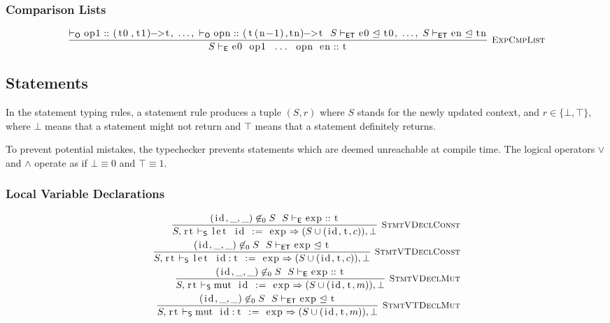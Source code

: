 \documentclass{article}
\newcommand{\code}[1]{\lstinline[columns=fixed]{#1}}
\newcommand{\drmrule}[5]{\frac{#1}{#2\vdash_{\mathsf{#3}}#4}\textsc{\ \small{#5}}}
\newcommand{\ruleapp}[1]{\vdash_{\mathsf{#1}}}
\newcommand{\mc}[1]{\textnormal{\code{#1}}}
\begin{document}
			\subsubsection{Comparison Lists}
			
				\begin{align*}
					\drmrule{\ruleapp{O}\mc{op1}::\mc{(t0,t1)->t},\ \dots,\ \ruleapp{O}\mc{opn}::\mc{(t(n-1),tn)->t}\ \ S\ruleapp{ET}\mc{e0}\trianglelefteq\mc{t0},\ \dots,\ S\ruleapp{ET}\mc{en}\trianglelefteq\mc{tn}}{S}{E}{\mc{e0 op1 ... opn en} :: \mc{t}}{ExpCmpList}
				\end{align*}
				
		\subsection{Statements}
		
			In the statement typing rules, a statement rule produces a tuple $(S,r)$ where $S$ stands for the newly updated context, and $r\in\{\bot,\top\}$, where $\bot$ means that a statement might not return and $\top$ means that a statement definitely returns.
			
			To prevent potential mistakes, the typechecker prevents statements which are deemed unreachable at compile time. The logical operators $\vee$ and $\wedge$ operate as if $\bot\equiv0$ and $\top\equiv1$.
		
			\subsubsection{Local Variable Declarations}
			
				\begin{align*}
					\drmrule{(\mc{id},\_,\_)\not\in_0 S\ \ S\ruleapp{E}\mc{exp} :: \mc{t}}{S,\mc{rt}}{S}{\mc{let id := exp} \Rightarrow (S \cup (\mc{id},\mc{t},c)),\bot}{StmtVDeclConst}\\
					\drmrule{(\mc{id},\_,\_)\not\in_0 S\ \ S\ruleapp{ET}\mc{exp}\trianglelefteq\mc{t}}{S,\mc{rt}}{S}{\mc{let id:t := exp} \Rightarrow (S \cup (\mc{id},\mc{t},c)),\bot}{StmtVTDeclConst}\\
					\drmrule{(\mc{id},\_,\_)\not\in_0 S\ \ S\ruleapp{E}\mc{exp} :: \mc{t}}{S,\mc{rt}}{S}{\mc{mut id := exp} \Rightarrow (S \cup (\mc{id},\mc{t},m)),\bot}{StmtVDeclMut}\\
					\drmrule{(\mc{id},\_,\_)\not\in_0 S\ \ S\ruleapp{ET}\mc{exp}\trianglelefteq\mc{t}}{S,\mc{rt}}{S}{\mc{mut id:t := exp} \Rightarrow (S \cup (\mc{id},\mc{t},m)),\bot}{StmtVTDeclMut}
				\end{align*}
			
\end{document}
